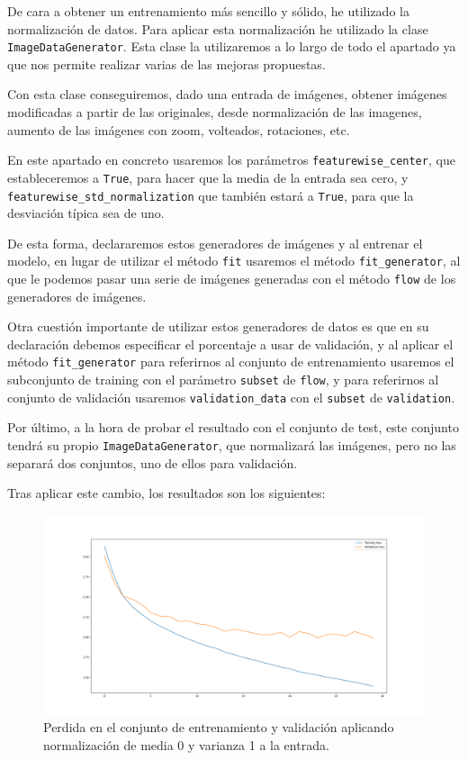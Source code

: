 \documentclass[12pt, spanish]{article}
\begin{document}
De cara a obtener un entrenamiento más sencillo y sólido, he utilizado la normalización de datos. Para aplicar esta normalización he utilizado la clase \texttt{ImageDataGenerator}\cite{imagedatagenerator}. Esta clase la utilizaremos a lo largo de todo el apartado ya que nos permite realizar varias de las mejoras propuestas.

Con esta clase conseguiremos, dado una entrada de imágenes, obtener imágenes modificadas a partir de las originales, desde normalización de las imagenes, aumento de las imágenes con zoom, volteados, rotaciones, etc.

En este apartado en concreto usaremos los parámetros \texttt{featurewise\_center}, que estableceremos a \texttt{True}, para hacer que la media de la entrada sea cero, y \texttt{featurewise\_std\_normalization} que también estará a \texttt{True}, para que la desviación típica sea de uno.

De esta forma, declararemos estos generadores de imágenes y al entrenar el modelo, en lugar de utilizar el método \texttt{fit} usaremos el método \texttt{fit\_generator}, al que le podemos pasar una serie de imágenes generadas con el método \texttt{flow} de los generadores de imágenes.

Otra cuestión importante de utilizar estos generadores de datos es que en su declaración debemos especificar el porcentaje a usar de validación, y al aplicar el método \texttt{fit\_generator} para referirnos al conjunto de entrenamiento usaremos el subconjunto de training con el parámetro \texttt{subset} de \texttt{flow}, y para referirnos al conjunto de validación usaremos \texttt{validation\_data} con el \texttt{subset} de \texttt{validation}.

Por último, a la hora de probar el resultado con el conjunto de test, este conjunto tendrá su propio \texttt{ImageDataGenerator}, que normalizará las imágenes, pero no las separará dos conjuntos, uno de ellos para validación.


Tras aplicar este cambio, los resultados son los siguientes:



\begin{figure}[H]
  \centering
      \includegraphics[width=\textwidth]{1-2-norm.png}
 		\caption{Perdida en el conjunto de entrenamiento y validación aplicando normalización de media 0 y varianza 1 a la entrada.}
\end{figure}
\end{document}
